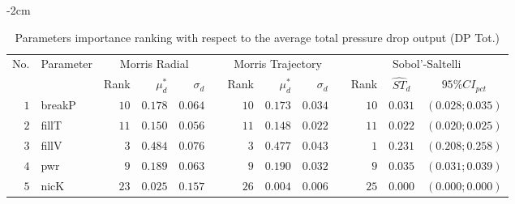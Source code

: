\begin{table*}[!htbp]\centering
{}
\begin{adjustwidth*}{}{-2cm}
\caption{Parameters importance ranking with respect to the average total pressure drop output (DP Tot.)}
\label{tab:app_screening_dptot_average}
\begin{tabular}{@{}rlrrrrrrrrrcc@{}}\toprule
\multirow{2}{*}{\footnotesize{No.}} & \multirow{2}{*}{\footnotesize{Parameter}} & \multicolumn{3}{c}{\footnotesize{Morris Radial}} & \phantom{a} & \multicolumn{3}{c}{\footnotesize{Morris Trajectory}}  &\phantom{a}& \multicolumn{3}{c}{\footnotesize{Sobol'-Saltelli}}                               \\             
                                                                                  \cmidrule{3-5}                                                   \cmidrule{7-9}                                                      \cmidrule{11-13}
                                    &                                           & \footnotesize{Rank}   & $\mu^*_d$ & $\sigma_d$   &             & \footnotesize{Rank} & $\mu^*_d$ & $\sigma_d$          &           & \footnotesize{Rank} & \footnotesize{$\hat{ST}_d$} & \footnotesize{$95\%CI_{pct}$}\\ \midrule
\footnotesize{$1 $} & \footnotesize{breakP   } & \footnotesize{$10$} & \footnotesize{$0.178$} & \footnotesize{$0.064$} && \footnotesize{$10$} & \footnotesize{$0.173$} & \footnotesize{$0.034$} && \footnotesize{$10$} & \footnotesize{$0.031$} & \footnotesize{$(0.028;0.035)$} \\
\footnotesize{$2 $} & \footnotesize{fillT    } & \footnotesize{$11$} & \footnotesize{$0.150$} & \footnotesize{$0.056$} && \footnotesize{$11$} & \footnotesize{$0.148$} & \footnotesize{$0.022$} && \footnotesize{$11$} & \footnotesize{$0.022$} & \footnotesize{$(0.020;0.025)$} \\
\footnotesize{$3 $} & \footnotesize{fillV    } & \footnotesize{$3 $} & \footnotesize{$0.484$} & \footnotesize{$0.076$} && \footnotesize{$3 $} & \footnotesize{$0.477$} & \footnotesize{$0.043$} && \footnotesize{$1 $} & \footnotesize{$0.231$} & \footnotesize{$(0.208;0.258)$} \\
\footnotesize{$4 $} & \footnotesize{pwr      } & \footnotesize{$9 $} & \footnotesize{$0.189$} & \footnotesize{$0.063$} && \footnotesize{$9 $} & \footnotesize{$0.190$} & \footnotesize{$0.032$} && \footnotesize{$9 $} & \footnotesize{$0.035$} & \footnotesize{$(0.031;0.039)$} \\
\footnotesize{$5 $} & \footnotesize{nicK     } & \footnotesize{$23$} & \footnotesize{$0.025$} & \footnotesize{$0.157$} && \footnotesize{$26$} & \footnotesize{$0.004$} & \footnotesize{$0.006$} && \footnotesize{$25$} & \footnotesize{$0.000$} & \footnotesize{$(0.000;0.000)$} \\

\end{tabular}
\end{adjustwidth*}
\end{table*}
